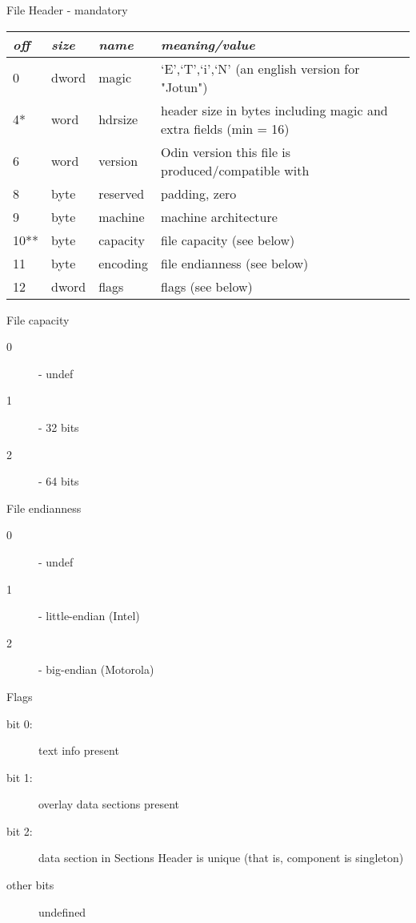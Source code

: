 \documentclass[onecolumn]{article}
\begin{document}
\begin{center}
\par File Header - mandatory
\begin{tabular}{|l|l|l|l|}\hline
\emph{off} & \emph{size} & \emph{name} & \emph{meaning/value} \\
\hline\hline
0      & dword    & magic      & `E',`T',`i',`N' (an english version for "Jotun") \\
4*     & word     & hdrsize    & header size in bytes including magic and extra fields (min = 16) \\
6      & word     & version    & Odin version this file is produced/compatible with \\
8      & byte     & reserved   & padding, zero \\
9      & byte     & machine    & machine architecture \\
10**   & byte     & capacity   & file capacity (see below) \\
11     & byte     & encoding   & file endianness (see below) \\
12     & dword    & flags      & flags (see below) \\
\hline
\end{tabular}
\end{center}

\par File capacity
\begin{description}
\item[ 0 ] - undef
\item[ 1 ] - 32 bits
\item[ 2 ] - 64 bits
\end{description}

\par File endianness
\begin{description}
\item[ 0 ] - undef
\item[ 1 ] - little-endian (Intel)
\item[ 2 ] - big-endian (Motorola)
\end{description}

\par Flags
\begin{description}
\item[ bit 0: ] text info present
\item[ bit 1: ] overlay data sections present
\item[ bit 2: ] data section in Sections Header is unique (that is, component is singleton)
\item[ other bits ] undefined
\end{description}
\end{document}
